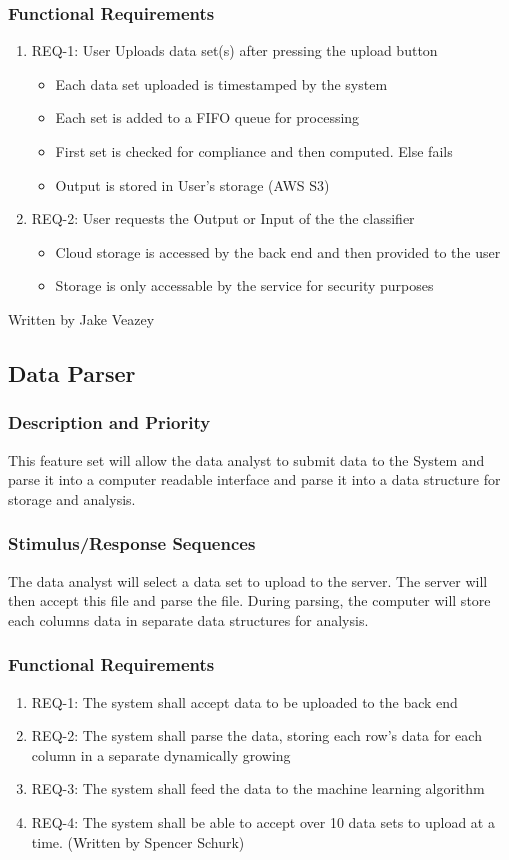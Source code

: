 \documentclass[12pt,oneside,letterpaper]{article}
\begin{document}
\subsubsection{Functional Requirements}
\begin{enumerate}
\item REQ-1: User Uploads data set(s) after pressing the upload button
\begin{itemize}
    \item Each data set uploaded is timestamped by the system
    \item Each set is added to a FIFO queue for processing
    \item First set is checked for compliance and then computed. Else fails
    \item Output is stored in User's storage (AWS S3)
\end{itemize}
\item REQ-2: User requests the Output or Input of the the classifier
\begin{itemize}
    \item Cloud storage is accessed by the \gls{back end} and then provided to the user
    \item Storage is only accessable by the service for security purposes
\end{itemize}
\end{enumerate}
Written by Jake Veazey

\subsection{Data Parser}
\subsubsection{Description and Priority}
This feature set will allow the data analyst to submit data to the System and parse it into a computer readable interface and parse it into a data structure for storage and analysis. \subsubsection{Stimulus/Response Sequences}
The data analyst will select a data set to upload to the server. The server will then accept this file and parse the file. During parsing, the computer will store each columns data in separate data structures for analysis. 
\subsubsection{Functional Requirements}
\begin{enumerate}
\item REQ-1: The system shall accept data to be uploaded to the \gls{back end}
\item REQ-2: The system shall parse the data, storing each row's data for each column in a separate dynamically growing
\item REQ-3: The system shall feed the data to the machine learning algorithm
\item REQ-4: The system shall be able to accept over 10 data sets to upload at a time. (Written by Spencer Schurk)
\end{enumerate}
\end{document}
